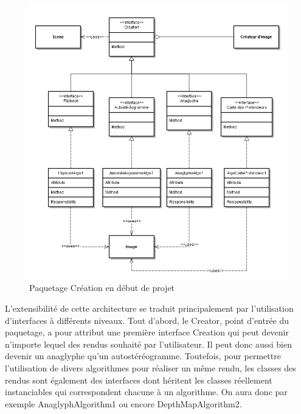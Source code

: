 \begin{figure}[h]
	\centering      
	\includegraphics[scale=0.45]{old_crea.png}
	\caption{\label{fig:creation_cdc} Paquetage Création en début de projet  \protect \footnotemark}
\end{figure}

        L'extensibilité de cette architecture se traduit principalement par l'utilisation d'interfaces à différents niveaux. Tout d'abord, le Creator, point d'entrée du paquetage, a pour attribut une première interface Creation qui peut devenir n'importe lequel des rendus souhaité par l'utilisateur. Il peut donc aussi bien devenir un anaglyphe qu'un autostéréogramme. Toutefois, pour permettre l'utilisation de divers algorithmes pour réaliser un même rendu, les classes des rendus sont également des interfaces dont héritent les classes réellement instanciables qui correspondent chacune à un algorithme. On aura donc par exemple AnaglyphAlgorithm1 ou encore DepthMapAlgorithm2.

